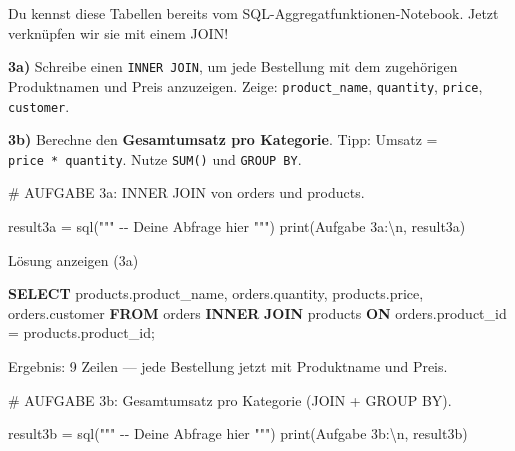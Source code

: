 \documentclass[
  nswissgerman,
  a4paper,
  DIV=11,
  numbers=noendperiod,
  ngerman]{scrreprt}
\newenvironment{Shaded}{\begin{snugshade}}{\end{snugshade}}
\newcommand{\BuiltInTok}[1]{\textcolor[rgb]{0.00,0.23,0.31}{#1}}
\newcommand{\CharTok}[1]{\textcolor[rgb]{0.13,0.47,0.30}{#1}}
\newcommand{\CommentTok}[1]{\textcolor[rgb]{0.37,0.37,0.37}{#1}}
\newcommand{\KeywordTok}[1]{\textcolor[rgb]{0.00,0.23,0.31}{\textbf{#1}}}
\newcommand{\NormalTok}[1]{\textcolor[rgb]{0.00,0.23,0.31}{#1}}
\newcommand{\OperatorTok}[1]{\textcolor[rgb]{0.37,0.37,0.37}{#1}}
\newcommand{\StringTok}[1]{\textcolor[rgb]{0.13,0.47,0.30}{#1}}
\begin{document}
Du kennst diese Tabellen bereits vom SQL-Aggregatfunktionen-Notebook.
Jetzt verknüpfen wir sie mit einem JOIN!

\textbf{3a)} Schreibe einen \texttt{INNER\ JOIN}, um jede Bestellung mit
dem zugehörigen Produktnamen und Preis anzuzeigen. Zeige:
\texttt{product\_name}, \texttt{quantity}, \texttt{price},
\texttt{customer}.

\textbf{3b)} Berechne den \textbf{Gesamtumsatz pro Kategorie}. Tipp:
Umsatz = \texttt{price\ *\ quantity}. Nutze \texttt{SUM()} und
\texttt{GROUP\ BY}.

\begin{Shaded}
\begin{Highlighting}[numbers=left,,]
\CommentTok{\# AUFGABE 3a: INNER JOIN von orders und products.}

\NormalTok{result3a }\OperatorTok{=}\NormalTok{ sql(}\StringTok{"""}
\StringTok{{-}{-} Deine Abfrage hier}
\StringTok{"""}\NormalTok{)}
\BuiltInTok{print}\NormalTok{(}\StringTok{\textquotesingle{}Aufgabe 3a:}\CharTok{\textbackslash{}n}\StringTok{\textquotesingle{}}\NormalTok{, result3a)}
\end{Highlighting}
\end{Shaded}

Lösung anzeigen (3a)

\begin{Shaded}
\begin{Highlighting}[numbers=left,,]
\KeywordTok{SELECT}\NormalTok{ products.product\_name, orders.quantity, products.price, orders.customer}
\KeywordTok{FROM}\NormalTok{ orders}
\KeywordTok{INNER} \KeywordTok{JOIN}\NormalTok{ products}
  \KeywordTok{ON}\NormalTok{ orders.product\_id }\OperatorTok{=}\NormalTok{ products.product\_id;}
\end{Highlighting}
\end{Shaded}

Ergebnis: 9 Zeilen --- jede Bestellung jetzt mit Produktname und Preis.

\begin{Shaded}
\begin{Highlighting}[numbers=left,,]
\CommentTok{\# AUFGABE 3b: Gesamtumsatz pro Kategorie (JOIN + GROUP BY).}

\NormalTok{result3b }\OperatorTok{=}\NormalTok{ sql(}\StringTok{"""}
\StringTok{{-}{-} Deine Abfrage hier}
\StringTok{"""}\NormalTok{)}
\BuiltInTok{print}\NormalTok{(}\StringTok{\textquotesingle{}Aufgabe 3b:}\CharTok{\textbackslash{}n}\StringTok{\textquotesingle{}}\NormalTok{, result3b)}
\end{Highlighting}
\end{Shaded}
\end{document}
